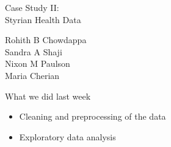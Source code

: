 {
\begin{frame}[noframenumbering]

\vspace{2cm}

\begin{center}
    {\fontsize{24}{28}\selectfont \color{tugreen}
    Case Study II: \\[0.3cm]
    Styrian Health Data}
\end{center}

\vspace{1.25cm}

\begin{flushleft}
    {\large \color{black}
    Rohith B Chowdappa\\
    Sandra A Shaji\\
    Nixon M Paulson\\
    Maria Cherian}
\end{flushleft}

\end{frame}
}

\begin{frame}

    \vspace{0.5cm}

    {\raggedright
        {\fontsize{16}{20}\selectfont \color{tugreen} What we did last week}
    }
    \vspace{0.5cm}
    {
    \begin{itemize}
        \item Cleaning and preprocessing of the data
        \item Exploratory data analysis
    \end{itemize}

    }

\end{frame}

